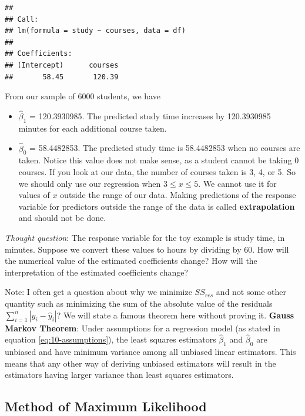 \documentclass[
]{book}
\providecommand{\tightlist}{%
  \setlength{\itemsep}{0pt}\setlength{\parskip}{0pt}}
\begin{document}
\begin{verbatim}
## 
## Call:
## lm(formula = study ~ courses, data = df)
## 
## Coefficients:
## (Intercept)      courses  
##       58.45       120.39
\end{verbatim}

From our sample of 6000 students, we have

\begin{itemize}
\tightlist
\item
  \(\hat{\beta}_1\) = 120.3930985. The predicted study time increases by 120.3930985 minutes for each additional course taken.
\item
  \(\hat{\beta}_0\) = 58.4482853. The predicted study time is 58.4482853 when no courses are taken. Notice this value does not make sense, as a student cannot be taking 0 courses. If you look at our data, the number of courses taken is 3, 4, or 5. So we should only use our regression when \(3 \leq x \leq 5\). We cannot use it for values of \(x\) outside the range of our data. Making predictions of the response variable for predictors outside the range of the data is called \textbf{extrapolation} and should not be done.
\end{itemize}

\emph{Thought question}: The response variable for the toy example is study time, in minutes. Suppose we convert these values to hours by dividing by 60. How will the numerical value of the estimated coefficients change? How will the interpretation of the estimated coefficients change?

Note: I often get a question about why we minimize \(SS_{res}\) and not some other quantity such as minimizing the sum of the absolute value of the residuals \(\sum_{i=1}^n |y_i - \hat{y}_i|\)? We will state a famous theorem here without proving it. \textbf{Gauss Markov Theorem}: Under assumptions for a regression model (as stated in equation \eqref{eq:10-assumptions}), the least squares estimators \(\hat{\beta}_1\) and \(\hat{\beta}_0\) are unbiased and have minimum variance among all unbiased linear estimators. This means that any other way of deriving unbiased estimators will result in the estimators having larger variance than least squares estimators.

\hypertarget{method-of-maximum-likelihood}{%
\subsection{Method of Maximum Likelihood}\label{method-of-maximum-likelihood}}
\end{document}
